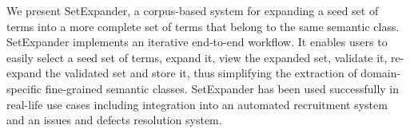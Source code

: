 We present SetExpander, a corpus-based system for expanding a seed set of terms into a more complete set of terms that belong to the same semantic class. SetExpander implements an iterative end-to-end workflow. It enables users to easily select a seed set of terms, expand it, view the expanded set, validate it, re-expand the validated set and store it, thus simplifying the extraction of domain-specific fine-grained semantic classes. SetExpander has been used successfully in real-life use cases including integration into an automated recruitment system and an issues and defects resolution system.
